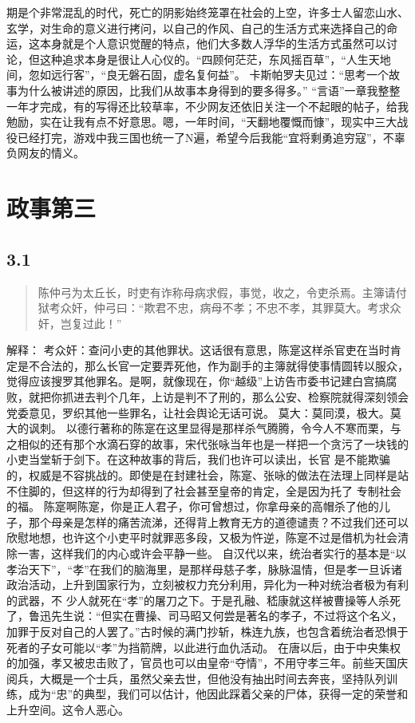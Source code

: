 \documentclass[]{book}
\begin{document}
期是个非常混乱的时代，死亡的阴影始终笼罩在社会的上空，许多士人留恋山水、玄学，对生命的意义进行拷问，以自己的作风、自己的生活方式来选择自己的命运，这本身就是个人意识觉醒的特点，他们大多数人浮华的生活方式虽然可以讨论，但这种追求本身是很让人心仪的。``四顾何茫茫，东风摇百草''，``人生天地间，忽如远行客''，``良无磐石固，虚名复何益''。
卡斯帕罗夫见过：``思考一个故事为什么被讲述的原因，比我们从故事本身得到的要多得多。''
``言语''一章我整整一年才完成，有的写得还比较草率，不少网友还依旧关注一个不起眼的帖子，给我勉励，实在让我有点不好意思。嗯，一年时间，``天翻地覆慨而慷''，现实中三大战役已经打完，游戏中我三国也统一了N遍，希望今后我能``宜将剩勇追穷寇''，不辜负网友的情义。

\chapter{政事第三}

\section{3.1}\label{section-155}

\begin{quote}
陈仲弓为太丘长，时吏有诈称母病求假，事觉，收之，令吏杀焉。主簿请付狱考众奸，仲弓曰：``欺君不忠，病母不孝；不忠不孝，其罪莫大。考求众奸，岂复过此！''
\end{quote}

解释：
考众奸：查问小吏的其他罪状。这话很有意思，陈寔这样杀官吏在当时肯定是不合法的，那么长官一定要弄死他，作为副手的主簿就得使事情圆转以服众，觉得应该搜罗其他罪名。是啊，就像现在，你``越级''上访告市委书记建白宫搞腐败，就把你抓进去判个几年，上访是判不了刑的，那么公安、检察院就得深刻领会党委意见，罗织其他一些罪名，让社会舆论无话可说。
莫大：莫同漠，极大。莫大的讽刺。
以德行著称的陈寔在这里显得是那样杀气腾腾，令今人不寒而栗，与之相似的还有那个水滴石穿的故事，宋代张咏当年也是一样把一个贪污了一块钱的小吏当堂斩于剑下。在这种故事的背后，我们也许可以读出，长官
是不能欺骗的，权威是不容挑战的。即使是在封建社会，陈寔、张咏的做法在法理上同样是站不住脚的，但这样的行为却得到了社会甚至皇帝的肯定，全是因为托了
专制社会的福。
陈寔啊陈寔，你是正人君子，你可曾想过，你拿母亲的高帽杀了他的儿子，那个母亲是怎样的痛苦流涕，还得背上教育无方的道德谴责？不过我们还可以欣慰地想，也许这个小吏平时就罪恶多段，又极为忤逆，陈寔不过是借机为社会清除一害，这样我们的内心或许会平静一些。
自汉代以来，统治者实行的基本是``以孝治天下''，``孝''在我们的脑海里，是那样母慈子孝，脉脉温情，但是孝一旦诉诸政治活动，上升到国家行为，立刻被权力充分利用，异化为一种对统治者极为有利的武器，不
少人就死在``孝''的屠刀之下。于是孔融、嵇康就这样被曹操等人杀死了，鲁迅先生说：``但实在曹操、司马昭又何尝是著名的孝子，不过将这个名义，加罪于反对自己的人罢了。''古时候的满门抄斩，株连九族，也包含着统治者恐惧于死者的子女可能以``孝''为挡箭牌，以此进行血仇活动。
在唐以后，由于中央集权的加强，孝又被忠击败了，官员也可以由皇帝``夺情''，不用守孝三年。前些天国庆阅兵，大概是一个士兵，虽然父亲去世，但他没有抽出时间去奔丧，坚持队列训练，成为``忠''的典型，我们可以估计，他因此踩着父亲的尸体，获得一定的荣誉和上升空间。这令人恶心。
\end{document}
